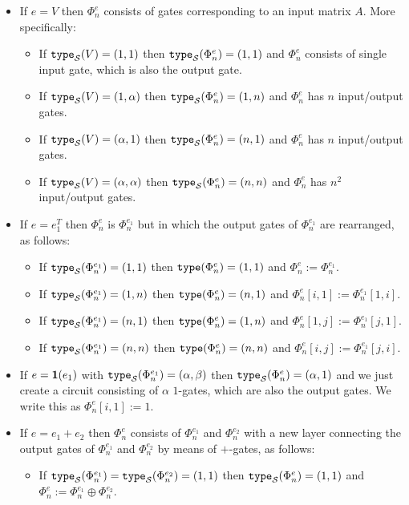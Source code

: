 \begin{itemize}
	\item
	If $e=V$ then $\Phi_n^e$ consists of gates corresponding to an input matrix $A$. More specifically:
\begin{itemize}
	\item If $\texttt{type}_{\mathcal{S}}(V)=(1,1)$ then $\texttt{type}_{\mathcal{S}}(\Phi^e_n)=(1,1)$ and $\Phi_n^e$ consists of single input gate, which is also
	the output gate.
	\item If $\texttt{type}_{\mathcal{S}}(V)=(1,\alpha)$ then $\texttt{type}_{\mathcal{S}}(\Phi^e_n)=(1,n)$ and $\Phi^e_n$ has $n$ input/output gates.
  \item If $\texttt{type}_{\mathcal{S}}(V)=(\alpha,1)$ then $\texttt{type}_{\mathcal{S}}(\Phi^e_n)=(n,1)$ and $\Phi^e_n$ has $n$ input/output gates.
	\item If $\texttt{type}_{\mathcal{S}}(V)=(\alpha,\alpha)$ then $\texttt{type}_{\mathcal{S}}(\Phi^e_n)=(n,n)$ and $\Phi^e_n$ has $n^2$ input/output gates. 
\end{itemize}
\item
If $e=e_1^T$ then $\Phi^e_n$ is $\Phi^{e_1}_n$ but in which the output gates of $\Phi_n^{e_1}$ are rearranged, as follows:
\begin{itemize}
	\item If $\texttt{type}_{\mathcal{S}}(\Phi^{e_1}_n)=(1, 1)$ then $\texttt{type}(\Phi^e_n)=(1,1)$ and $\Phi_n^e:=\Phi_n^{e_1}$.
	\item If $\texttt{type}_{\mathcal{S}}(\Phi^{e_1}_n)=(1, n)$ then $\texttt{type}(\Phi^e_n)=(n,1)$ and $\Phi^e_n[i,1]:=\Phi^{e_1}_n[1,i]$. 
  \item If $\texttt{type}_{\mathcal{S}}(\Phi^{e_1}_n)=(n, 1)$ then $\texttt{type}(\Phi^e_n)=(1,n)$ and $\Phi^e_n[1,j]:=\Phi^{e_1}_n[j,1]$. 
  \item If $\texttt{type}_{\mathcal{S}}(\Phi^{e_1}_n)=(n, n)$ then $\texttt{type}(\Phi^e_n)=(n,n)$ and $\Phi^e_n[i,j]:=\Phi^{e_1}_n[j,i]$. 
\end{itemize}
\item
If $e={\mathbf{1}}(e_1)$ with $\texttt{type}_{\mathcal{S}}(\Phi^{e_1}_n)=(\alpha,\beta)$ then $\texttt{type}_{\mathcal{S}}(\Phi^{e}_n)=(\alpha,1)$ and we just
create a circuit consisting of $\alpha$ $1$-gates, which are also the output gates. We write this as
$\Phi^e_n[i,1]:=1$.
\item
If $e=e_1 + e_2$ then $\Phi_n^e$ consists of $\Phi_n^{e_1}$ and $\Phi_n^{e_2}$ with a new layer connecting the output gates of $\Phi_n^{e_1}$ and $\Phi_n^{e_2}$ by means
of $+$-gates, as follows:
\begin{itemize}
	\item If $\texttt{type}_{\mathcal{S}}(\Phi^{e_1}_n)=\texttt{type}_{\mathcal{S}}(\Phi^{e_2}_n)=(1, 1)$  then $\texttt{type}_{\mathcal{S}}(\Phi^{e}_n)=(1, 1)$ and $\Phi^e_n:=\Phi^{e_1}_n \oplus \Phi^{e_2}_n$.

\end{itemize}
\end{itemize}
